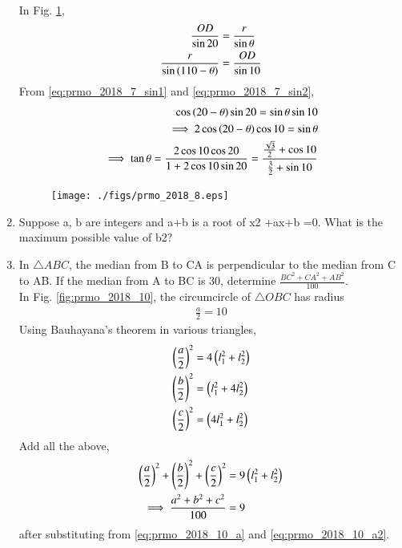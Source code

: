 \documentclass[journal,12pt,twocolumn]{IEEEtran}
\begin{document}
\begin{enumerate}[label=\arabic*]
\\
\solution In Fig. \ref{fig:prmo_2018_8},
\begin{align}
\label{eq:prmo_2018_7_sin1}
\frac{OD}{\sin 20} &= \frac{r}{\sin \theta}
\\
\frac{r}{\sin \brak{110-\theta}} &= \frac{OD}{\sin 10}
\label{eq:prmo_2018_7_sin2}
\end{align}
%
From \eqref{eq:prmo_2018_7_sin1} and \eqref{eq:prmo_2018_7_sin2},
\begin{align}
\cos \left(20-\theta\right)\sin 20 = \sin \theta \sin 10 &
\\
\implies 2\cos \left(20-\theta\right)\cos 10 = \sin \theta &
\\
\implies \tan \theta = \frac{2\cos 10 \cos 20}{1 + 2\cos 10\sin 20} = \frac{\frac{\sqrt{3}}{2}+\cos 10 }{\frac{3}{2}+\sin 10}&
\end{align}
\begin{figure}[!ht]
\centering
\texttt{[image: ./figs/prmo\_2018\_8.eps]}
\caption{}
\label{fig:prmo_2018_8}
\end{figure}
\item Suppose a, b are integers and a+b is a root of x2 +ax+b =0. What is the maximum possible value of b2? 
\item In $\triangle ABC$, the median from B to CA is perpendicular to the median from C to AB. If the median from A to BC is 30, determine $\frac{BC^2 +CA^2 +AB^2}{100}$.
\\
\solution In Fig. \ref{fig:prmo_2018_10}, the circumcircle of $\triangle OBC$ has radius 
\begin{align}
\frac{a}{2} = 10
\label{eq:prmo_2018_10_a}
\end{align}
%
Using Bauhayana's theorem in various triangles, 
\begin{align}
\label{eq:prmo_2018_10_a2}
\brak{\frac{a}{2}}^2 &= 4 \brak{l_1^2+l_2^2} 
\\
\brak{\frac{b}{2}}^2 &=  \brak{l_1^2+4l_2^2} 
\\
\brak{\frac{c}{2}}^2 &=  \brak{4l_1^2+l_2^2} 
\end{align}
Add all the above, 
\begin{align}
\left(\frac{a}{2}\right)^2 + \left(\frac{b}{2}\right)^2 + \left(\frac{c}{2}\right)^2&= 9 \left(l_1^2+l_2^2\right) 
\\
\implies \frac{a^2+b^2+c^2}{100}&=9
\end{align}
after substituting from \eqref{eq:prmo_2018_10_a} and 
\eqref{eq:prmo_2018_10_a2}.


\end{enumerate}
\end{document}
